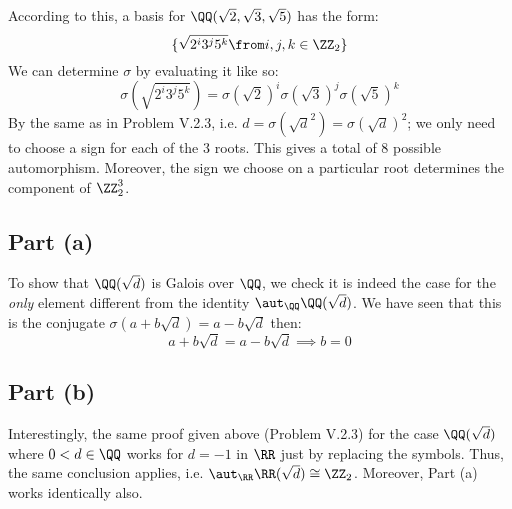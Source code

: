 According to this, a basis for $\QQ(\sqrt 2, \sqrt 3, \sqrt 5)$ has the form:
$$\{\sqrt{2^i3^j5^k} \from i,j,k\in \ZZ_2\}$$ 
 We can determine $\sigma$ by evaluating it like so:
$$\sigma(\sqrt{2^i3^j5^k}) = \sigma(\sqrt{2})^i\sigma(\sqrt{3})^j\sigma(\sqrt{5})^k$$   
By the same as in Problem V.2.3, i.e. $d=\sigma(\sqrt d^2)=\sigma(\sqrt d)^2$; we only need to choose a sign for each of the 3 roots. This gives a total of 8 possible automorphism. Moreover, the sign we choose on a particular root determines the component of $\ZZ_2^3$.

\subsection*{Part (a)}
To show that $\QQ(\sqrt{d})$ is Galois over $\QQ$, we check it is indeed the case for the \emph{only} element different from the identity $\aut_\QQ \QQ(\sqrt{d})$. We have seen that this is the conjugate $\sigma(a+b\sqrt{d})=a-b\sqrt{d}$ then:
$$a+b\sqrt{d}=a-b\sqrt{d} \implies b=0$$

\subsection*{Part (b)}
Interestingly, the same proof given above (Problem V.2.3) for the case $\QQ(\sqrt{d})$ where $0<d\in \QQ$ works for $d= -1$ in $\RR$ just by replacing the symbols. Thus, the same conclusion applies, i.e. $\aut_\RR\RR(\sqrt{d} )\cong \ZZ_2$. Moreover, Part (a) works identically also.
